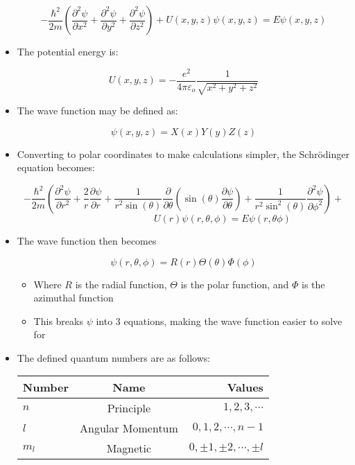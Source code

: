 \begin{itemize}
    $$-\dfrac{\hbar^2}{2m}\left( \dfrac{\partial^2\psi}{\partial x^2} + \dfrac{\partial^2\psi}{\partial y^2} + \dfrac{\partial^2\psi}{\partial z^2} \right)+U(x,y,z)\psi(x,y,z)=E\psi(x,y,z)$$

  \item The potential energy is:

    $$U(x,y,z)=-\dfrac{e^2}{4\pi\varepsilon_o}\dfrac{1}{\sqrt{x^2+y^2+z^2}}$$

  \item The wave function may be defined as:

    $$\psi(x,y,z)=X(x)Y(y)Z(z)$$

  \item Converting to polar coordinates to make calculations simpler, the Schr\"odinger equation becomes:

    $$-\dfrac{\hbar^2}{2m}\left( \dfrac{\partial^2\psi}{\partial r^2} + \dfrac{2}{r}\dfrac{\partial\psi}{\partial r}+\dfrac{1}{r^2\sin(\theta)}\dfrac{\partial}{\partial\theta}\left(\sin(\theta)\dfrac{\partial\psi}{\partial\theta}\right)+\dfrac{1}{r^2\sin^2(\theta)}\dfrac{\partial^2\psi}{\partial\phi^2}\right)+$$$$\quad\quad\quad\quad\quad\quad\quad\quad U(r)\psi(r,\theta,\phi)=E\psi(r,\theta\phi)$$

  \item The wave function then becomes

    $$\psi(r,\theta,\phi)=R(r)\Theta(\theta)\Phi(\phi)$$

    \begin{itemize}

      \item Where $R$ is the radial function, $\Theta$ is the polar function, and $\Phi$ is the azimuthal function

      \item This breaks $\psi$ into 3 equations, making the wave function easier to solve for

    \end{itemize}

  \item The defined quantum numbers are as follows:

    \begin{center}
      \begin{tabular}[h!]{| l | c | r |}
        \hline
        Number & Name & Values\\
        \hline
        $n$ & Principle & $1,2,3,\cdots$\\
        \hline
        $l$ & Angular Momentum & $0,1,2,\cdots,n-1$\\
        \hline
        $m_l$ & Magnetic & $0,\pm1,\pm2,\cdots,\pm l$\\
        \hline
      \end{tabular}
    \end{center}


\end{itemize}
